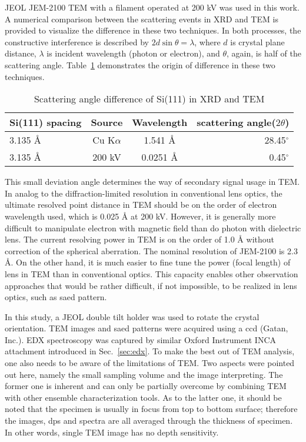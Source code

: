 JEOL JEM-2100 TEM with a  filament operated at 200 kV was used in this work. A numerical comparison between the scattering events in XRD and TEM is provided to visualize the difference in these two techniques. In both processes, the constructive interference is described by $2d\sin\theta = \lambda$, where $d$ is crystal plane distance, $\lambda$ is incident wavelength (photon or electron), and $\theta$, again, is half of the scattering angle. Table~\ref{tab:ch2tem} demonstrates the origin of difference in these two techniques.
\begin{table}[htb]
\centering
\caption{Scattering angle difference of Si(111) in XRD and TEM}\label{tab:ch2tem}
\begin{tabular}{lccr}
\toprule
Si(111) spacing & Source & Wavelength & scattering angle($2\theta$) \\
\midrule
3.135 \AA & Cu K$\alpha$ & 1.541 \AA & 28.45$^\circ$  \\
3.135 \AA & 200 kV & 0.0251 \si{\angstrom} & 0.45$^\circ$  \\
\bottomrule
\end{tabular}
\end{table}
This small deviation angle determines the way of secondary signal usage in TEM. In analog to the diffraction-limited resolution in conventional lens optics, the ultimate resolved point distance in TEM should be on the order of electron wavelength used, which is 0.025 \si{\angstrom} at 200 kV. However, it is generally more difficult to manipulate electron with magnetic field than do photon with dielectric lens. The current resolving power in TEM is on the order of 1.0 \si{\angstrom} without correction of the spherical aberration. The nominal resolution of JEM-2100 is 2.3 \si{\angstrom}. On the other hand, it is much easier to fine tune the power (focal length) of lens in TEM than in conventional optics. This capacity enables other observation approaches that would be rather difficult, if not impossible, to be realized in lens optics, such as \gls{saed} pattern. 

In this study, a JEOL double tilt holder was used to rotate the crystal orientation. TEM images and \gls{saed} patterns were acquired using a \gls{ccd} (Gatan, Inc.). EDX spectroscopy was captured by similar Oxford Instrument INCA attachment introduced in Sec.~\ref{sec:edx}. To make the best out of TEM analysis, one also needs to be aware of the limitations of TEM. Two aspects were pointed out here, namely the small sampling volume and the image interpreting. The former one is inherent and can only be partially overcome by combining TEM with other ensemble characterization tools. As to the latter one, it should be noted that the specimen is usually in focus from top to bottom surface; therefore the images, \glspl{dp} and spectra are all averaged through the thickness of specimen. In other words, single TEM image has no depth sensitivity.\cite{Williams2009}  

